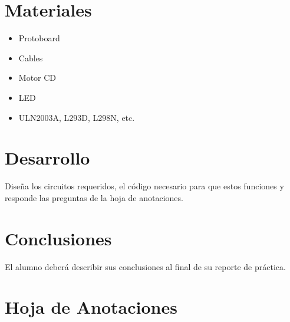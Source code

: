 
\section{Materiales}

	\begin{itemize}
		\item Protoboard
		\item Cables
		\item Motor CD
		\item LED
		\item ULN2003A, L293D, L298N, etc.
	\end{itemize}


\section{Desarrollo}

	Diseña los circuitos requeridos, el código necesario para que estos funciones y responde las preguntas de la hoja de anotaciones.


\section{Conclusiones}
	El alumno deberá describir sus conclusiones al final de su reporte de práctica.


\clearpage
\section{Hoja de Anotaciones}

